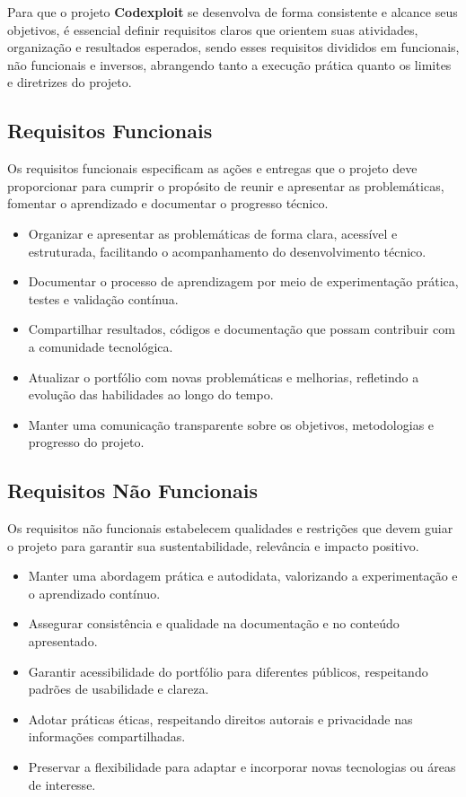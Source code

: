 \documentclass[10pt, a4paper, oneside]{article}
\begin{document}
Para que o projeto \textbf{Codexploit} se desenvolva de forma consistente e alcance seus objetivos, é essencial definir requisitos claros que orientem suas atividades, organização e resultados esperados, sendo esses requisitos divididos em funcionais, não funcionais e inversos, abrangendo tanto a execução prática quanto os limites e diretrizes do projeto.

\subsection{Requisitos Funcionais}

Os requisitos funcionais especificam as ações e entregas que o projeto deve proporcionar para cumprir o propósito de reunir e apresentar as problemáticas, fomentar o aprendizado e documentar o progresso técnico.

\begin{itemize}
    \item Organizar e apresentar as problemáticas de forma clara, acessível e estruturada, facilitando o acompanhamento do desenvolvimento técnico.
    \item Documentar o processo de aprendizagem por meio de experimentação prática, testes e validação contínua.
    \item Compartilhar resultados, códigos e documentação que possam contribuir com a comunidade tecnológica.
    \item Atualizar o portfólio com novas problemáticas e melhorias, refletindo a evolução das habilidades ao longo do tempo.
    \item Manter uma comunicação transparente sobre os objetivos, metodologias e progresso do projeto.
\end{itemize}

\subsection{Requisitos Não Funcionais}

Os requisitos não funcionais estabelecem qualidades e restrições que devem guiar o projeto para garantir sua sustentabilidade, relevância e impacto positivo.

\begin{itemize}
    \item Manter uma abordagem prática e autodidata, valorizando a experimentação e o aprendizado contínuo.
    \item Assegurar consistência e qualidade na documentação e no conteúdo apresentado.
    \item Garantir acessibilidade do portfólio para diferentes públicos, respeitando padrões de usabilidade e clareza.
    \item Adotar práticas éticas, respeitando direitos autorais e privacidade nas informações compartilhadas.
    \item Preservar a flexibilidade para adaptar e incorporar novas tecnologias ou áreas de interesse.
\end{itemize}
\end{document}
